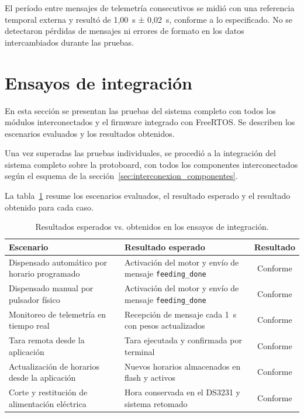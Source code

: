 El período entre mensajes de telemetría consecutivos se midió con una referencia
temporal externa y resultó de 1,00~s ± 0,02~s, conforme a lo especificado. No
se detectaron pérdidas de mensajes ni errores de formato en los datos
intercambiados durante las pruebas.

\section{Ensayos de integración}
\label{sec:ensayos_integracion}

En esta sección se presentan las pruebas del sistema completo con todos los
módulos interconectados y el firmware integrado con FreeRTOS. Se describen
los escenarios evaluados y los resultados obtenidos.

Una vez superadas las pruebas individuales, se procedió a la integración del
sistema completo sobre la protoboard, con todos los componentes
interconectados según el esquema de la sección~\ref{sec:interconexion_componentes}.

La tabla~\ref{tab:integracion} resume los escenarios evaluados, el resultado
esperado y el resultado obtenido para cada caso.

\begin{table}[H]
    \centering
    \caption{Resultados esperados vs. obtenidos en los ensayos de integración.}
    \label{tab:integracion}
    \begin{tabular}{p{5.5cm} p{5.5cm} c}
        \hline
        \textbf{Escenario} & \textbf{Resultado esperado} & \textbf{Resultado} \\
        \hline
        Dispensado automático por horario programado &
        Activación del motor y envío de mensaje \texttt{feeding\_done} &
        Conforme \\
        Dispensado manual por pulsador físico &
        Activación del motor y envío de mensaje \texttt{feeding\_done} &
        Conforme \\
        Monitoreo de telemetría en tiempo real &
        Recepción de mensaje cada 1~s con pesos actualizados &
        Conforme \\
        Tara remota desde la aplicación &
        Tara ejecutada y confirmada por terminal &
        Conforme \\
        Actualización de horarios desde la aplicación &
        Nuevos horarios almacenados en flash y activos &
        Conforme \\
        Corte y restitución de alimentación eléctrica &
        Hora conservada en el DS3231 y sistema retomado &
        Conforme \\
        \hline
    \end{tabular}
\end{table}

